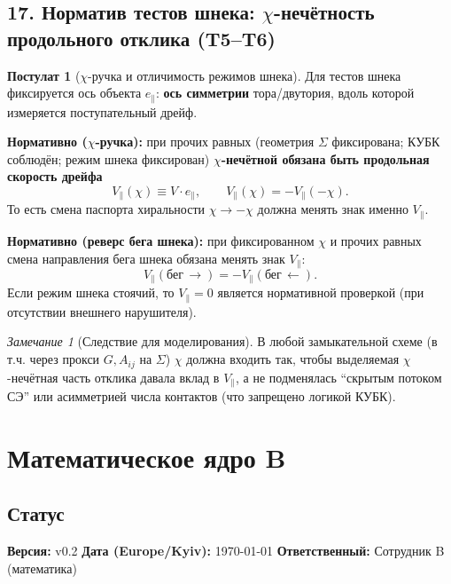 \documentclass[12pt]{article}
\newcommand{\SE}{\mbox{\textsc{СЭ}}}
\theoremstyle{definition}
\newtheorem{postulate}{Постулат}[section]
\theoremstyle{plain}
\theoremstyle{remark}
\newtheorem{remark}{Замечание}[section]
\begin{document}
\subsection{17. Норматив тестов шнека: \(\chi\)-нечётность продольного отклика (T5--T6)}
\begin{postulate}[\(\chi\)-ручка и отличимость режимов шнека]
Для тестов шнека фиксируется ось объекта \(e_{\parallel}\): \textbf{ось симметрии} тора/двутория, вдоль которой измеряется поступательный дрейф.

\textbf{Нормативно (\(\chi\)-ручка):} при прочих равных (геометрия \(\Sigma\) фиксирована; КУБК соблюдён; режим шнека фиксирован)
\textbf{\(\chi\)-нечётной обязана быть продольная скорость дрейфа}
\[
V_{\parallel}(\chi)\equiv V\cdot e_{\parallel},\qquad V_{\parallel}(\chi)=-V_{\parallel}(-\chi).
\]
То есть смена паспорта хиральности \(\chi\to-\chi\) должна менять знак именно \(V_{\parallel}\).

\textbf{Нормативно (реверс бега шнека):} при фиксированном \(\chi\) и прочих равных смена направления бега шнека
обязана менять знак \(V_{\parallel}\):
\[
V_{\parallel}(\text{бег}\,\rightarrow)=-V_{\parallel}(\text{бег}\,\leftarrow).
\]
Если режим шнека стоячий, то \(V_{\parallel}=0\) является нормативной проверкой (при отсутствии внешнего нарушителя).
\end{postulate}

\begin{remark}[Следствие для моделирования]
В любой замыкательной схеме (в т.ч. через прокси \(G, A_{ij}\) на \(\Sigma\)) \(\chi\) должна входить так, чтобы выделяемая
\(\chi\)-нечётная часть отклика давала вклад в \(V_{\parallel}\), а не подменялась ``скрытым потоком \SE'' или
асимметрией числа контактов (что запрещено логикой КУБК).
\end{remark}



\section{Математическое ядро  B}
\subsection*{Статус}
\textbf{Версия:} v0.2 \quad
\textbf{Дата (Europe/Kyiv):} \today \quad
\textbf{Ответственный:} Сотрудник B (математика)
\label{sec:math-core}

\end{document}

